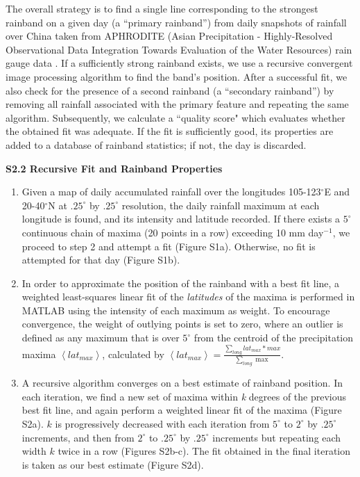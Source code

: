 \documentclass[final,grl]{agutexSI}
\begin{document}
\begin{article}
The overall strategy is to find a single line corresponding to the strongest rainband on a given day (a ``primary rainband'') from daily snapshots of rainfall over China taken from APHRODITE (Asian Precipitation - Highly-Resolved Observational Data Integration Towards Evaluation of the Water Resources) rain gauge data \citep{Yatagai2012}. If a sufficiently strong rainband exists, we use a recursive convergent image processing algorithm to find the band's position. After a successful fit, we also check for the presence of a second rainband (a ``secondary rainband'') by removing all rainfall associated with the primary feature and repeating the same algorithm. Subsequently, we calculate a ``quality score" which evaluates whether the obtained fit was adequate. If the fit is sufficiently good, its properties are added to a database of rainband statistics; if not, the day is discarded.
\vspace{3mm}

\noindent\textbf{S2.2 Recursive Fit and Rainband Properties}

\begin{enumerate}
	\item Given a map of daily accumulated rainfall over the longitudes 105-123$^{\circ}$E and 20-40$^{\circ}$N at $.25^{\circ}$ by $.25^{\circ}$ resolution, the daily rainfall maximum at each longitude is found, and its intensity and latitude recorded. If there exists a $5^{\circ}$ continuous chain of maxima (20 points in a row) exceeding 10 mm day$^{-1}$, we proceed to step 2 and attempt a fit (Figure S1a). Otherwise, no fit is attempted for that day (Figure S1b).
	
	\item In order to approximate the position of the rainband with a best fit line, a weighted least-squares linear fit of the \textit{latitudes} of the maxima is performed in MATLAB using the intensity of each maximum as weight. To encourage convergence, the weight of outlying points is set to zero, where an outlier is defined as any maximum that is over $5^{\circ}$ from the centroid of the precipitation maxima $\left<lat_{max}\right>$, calculated by $\left<lat_{max}\right>=\frac{\sum_{long} lat_{max}*max}{\sum_{long} \max}$.
	
	\item A recursive algorithm converges on a best estimate of rainband position. In each iteration, we find a new set of maxima within \textit{k} degrees of the previous best fit line, and again perform a weighted linear fit of the maxima (Figure S2a). $k$ is progressively decreased with each iteration from $5^{\circ}$ to $2^{\circ}$ by $.25^{\circ}$ increments, and then from $2^{\circ}$ to $.25^{\circ}$ by $.25^{\circ}$ increments but repeating each width $k$ twice in a row (Figures S2b-c). The fit obtained in the final iteration is taken as our best estimate (Figure S2d).
	

\end{enumerate}
\end{article}
\end{document}
